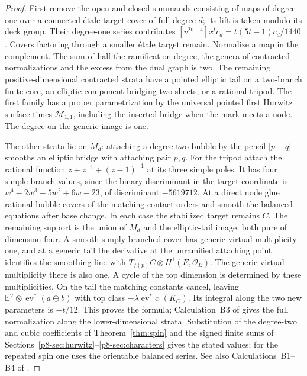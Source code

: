 \begin{proof}
First remove the open and closed summands consisting of maps of degree one over a connected étale target cover of full degree \(d\); its lift is taken modulo its deck group. Their degree-one series contributes \([v^{2t+4}]x^t c_d=t(5t-1)c_d/1440\). Covers factoring through a smaller étale target remain. Normalize a map in the complement. The sum of half the ramification degree, the genera of contracted normalizations and the excess from the dual graph is two. The remaining positive-dimensional contracted strata have a pointed elliptic tail on a two-branch finite core, an elliptic component bridging two sheets, or a rational tripod. The first family has a proper parametrization by the universal pointed first Hurwitz surface times \(\overline{\mathcal M}_{1,1}\), including the inserted bridge when the mark meets a node. The degree on the generic image is one.

The other strata lie on \(M_d\): attaching a degree-two bubble by the pencil \(|p+q|\) smooths an elliptic bridge with attaching pair \(p,q\). For the tripod attach the rational function \(z+z^{-1}+(z-1)^{-1}\) at its three simple poles. It has four simple branch values, since the binary discriminant in the target coordinate is \(w^4-2w^3-5w^2+6w-23\), of discriminant \(-5619712\). At a direct node glue rational bubble covers of the matching contact orders and smooth the balanced equations after base change. In each case the stabilized target remains \(C\). The remaining support is the union of \(M_d\) and the elliptic-tail image, both pure of dimension four. A smooth simply branched cover has generic virtual multiplicity one, and at a generic tail the derivative at the unramified attaching point identifies the smoothing line with \(T_{f(p)}C\otimes H^1(E,\mathcal O_E)\). The generic virtual multiplicity there is also one. A cycle of the top dimension is determined by these multiplicities. On the tail the matching constants cancel, leaving \(\mathbb E^\vee\otimes\operatorname{ev}^*(a\oplus b)\) with top class \(-\lambda\operatorname{ev}^*c_1(K_C)\). Its integral along the two new parameters is \(-t/12\). This proves the formula; Calculation~B3 of \cite{WueSupplement} gives the full normalization along the lower-dimensional strata. Substitution of the degree-two and cubic coefficients of Theorem~\ref{thm:spin} and the signed finite sums of Sections~\ref{p8-sec:hurwitz}--\ref{p8-sec:characters} gives the stated values; for the repeated spin one uses the orientable balanced series. See also Calculations~B1--B4 of \cite{WueSupplement}.
\end{proof}

